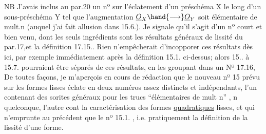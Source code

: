 NB J'avais inclus au par.20 un nº sur l'éclatement d'un
préschéma X le long d'un sous-préschéma  Y tel que l'augmentation
$\underline{O}_X \hand{\longrightarrow} \underline{O}_Y$ soit élémentaire de mult.n (auquel j'ai fait allusion dans
15.6.). Je signale qu'il s'agit d'un nº court et bien venu, dont les
seuls ingrédients sont les résultats généraux de lissité du par.17,et
la définition  17.15..  Rien n'empêcherait d'incopporer ces résultats
dès ici,  par exemple immédiatement après la définition
15.1. ci-dessus; alors  15.. à 15.7. pourraient être séparés
de ces  résultats, en les groupant dans un Nº 17.16, 
 De toutes façons, je m'aperçois en cours de rédaction que le
nouveau nº 15 prévu sur les formes lisses éclate en  deux numéros assez
distincts et indépendants, l'un contenant des sorites généraux pour
les trucs ``élémentaires de mult n'' , n quelconque, l'autre  cont la
caractérisation des formes \uline{quadratiques} lisses, et qui n'emprunte au
précédent que le nº 15.1. , i.e. pratiquement la définition de la lissité
d'une forme.

